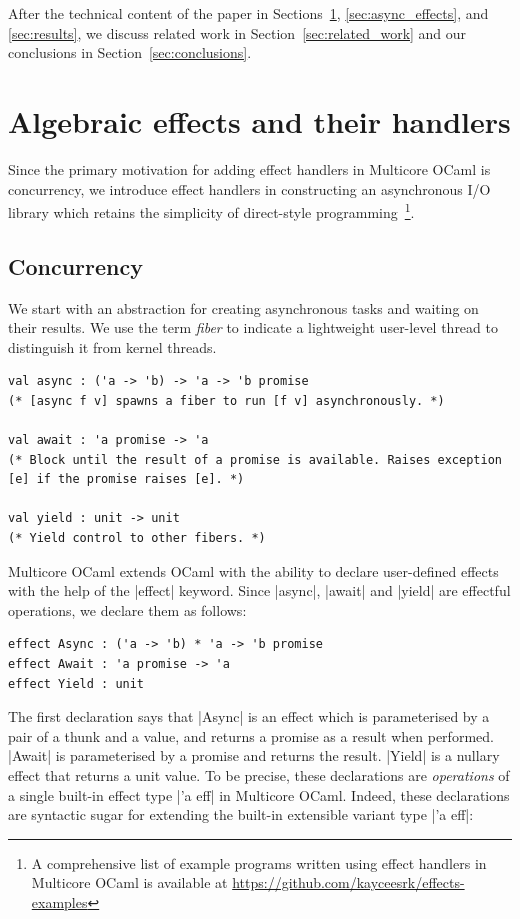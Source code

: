 \documentclass{llncs}
\begin{document}
After the technical content of the paper in
Sections~\ref{sec:effect_handlers}, \ref{sec:async_effects}, and
\ref{sec:results}, we discuss related work in
Section~\ref{sec:related_work} and our conclusions in
Section~\ref{sec:conclusions}.

\section{Algebraic effects and their handlers}
\label{sec:effect_handlers}

Since the primary motivation for adding effect handlers in Multicore
OCaml is concurrency, we introduce effect handlers in constructing an
asynchronous I/O library which retains the simplicity of direct-style
programming~\footnote{A comprehensive list of example programs written
  using effect handlers in Multicore OCaml is available at
  \url{https://github.com/kayceesrk/effects-examples}}.

\subsection{Concurrency}

We start with an abstraction for creating asynchronous tasks and waiting
on their results. We use the term \emph{fiber} to indicate a lightweight
user-level thread to distinguish it from kernel threads.
\begin{lstlisting}
val async : ('a -> 'b) -> 'a -> 'b promise
(* [async f v] spawns a fiber to run [f v] asynchronously. *)

val await : 'a promise -> 'a
(* Block until the result of a promise is available. Raises exception [e] if the promise raises [e]. *)

val yield : unit -> unit
(* Yield control to other fibers. *)
\end{lstlisting}

Multicore OCaml extends OCaml with the ability to declare user-defined effects
with the help of the |effect| keyword. Since |async|, |await| and |yield| are
effectful operations, we declare them as follows:

\begin{lstlisting}
effect Async : ('a -> 'b) * 'a -> 'b promise
effect Await : 'a promise -> 'a
effect Yield : unit
\end{lstlisting}

The first declaration says that |Async| is an effect which is parameterised by
a pair of a thunk and a value, and returns a promise as a result when
performed. |Await| is parameterised by a promise and returns the result.
|Yield| is a nullary effect that returns a unit value. To be precise, these
declarations are \emph{operations} of a single built-in effect type |'a eff| in
Multicore OCaml. Indeed, these declarations are syntactic sugar for
extending the built-in extensible variant type |'a eff|:
\end{document}
